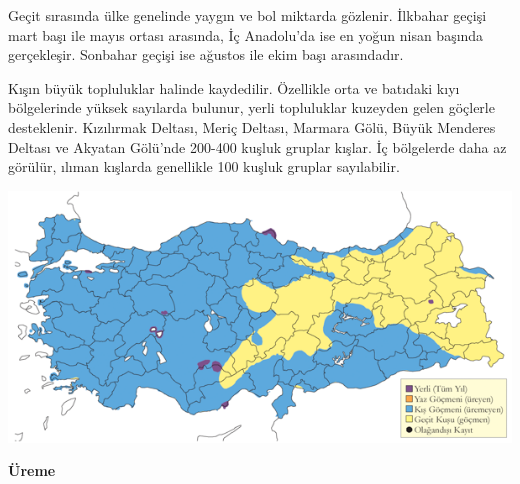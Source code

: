 \documentclass[
  letterpaper,
  DIV=11,
  numbers=noendperiod]{scrreprt}
\begin{document}
Geçit sırasında ülke genelinde yaygın ve bol miktarda gözlenir. İlkbahar
geçişi mart başı ile mayıs ortası arasında, İç Anadolu'da ise en yoğun
nisan başında gerçekleşir. Sonbahar geçişi ise ağustos ile ekim başı
arasındadır.

Kışın büyük topluluklar halinde kaydedilir. Özellikle orta ve batıdaki
kıyı bölgelerinde yüksek sayılarda bulunur, yerli topluluklar kuzeyden
gelen göçlerle desteklenir. Kızılırmak Deltası, Meriç Deltası, Marmara
Gölü, Büyük Menderes Deltası ve Akyatan Gölü'nde 200-400 kuşluk gruplar
kışlar. İç bölgelerde daha az görülür, ılıman kışlarda genellikle 100
kuşluk gruplar sayılabilir.

\includegraphics{images/harita_Page_071.png}

\textbf{Üreme}
\end{document}
